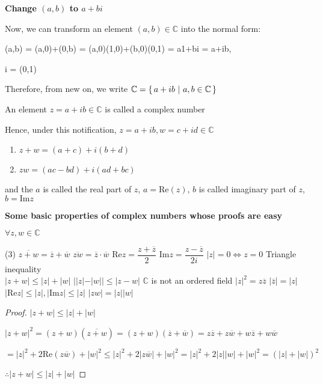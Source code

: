 \textbf{Change $(a,b)$ to $a+bi$}

\begin{tcolorbox}
	Now, we can transform an element $(a,b) \in \mathbb C$ into the normal form:

(a,b) = (a,0)+(0,b) = (a,0)(1,0)+(b,0)(0,1) = a1+bi = a+ib,

 i = (0,1)

Therefore, from new on, we write $\mathbb C = \left\{ \,a+ib~|~a,b \in \mathbb C \,\right\}$

An element $z = a+ib \in \mathbb C$ is called a complex number

Hence, under this notification, $z = a+ib,w = c+id \in \mathbb C$

\begin{enumerate}
	\item $z+w = (a+c) + i(b+d)$
	\item $zw = (ac-bd) + i(ad + bc)$
\end{enumerate}

and the $a$ is called the real part of $z$, $a = \text{Re}(z)$, $b$ is called imaginary part of $z$, $b = \text{Im}z$

\end{tcolorbox}

\newpage

\textbf{Some basic properties of complex numbers whose proofs are easy}

$\forall z,w \in \mathbb C$

\begin{tasks}(3)
	\task[$\cdot$] $\overline{z+w} = \overline{z} + \overline{w}$
	\task[$\cdot$] $\overline{zw} = \overline{z} \cdot \overline{w}$
	\task[$\cdot$] Re$z = \dfrac{z + \overline{z}}{2}$
	\task[$\cdot$] Im$z = \dfrac{z - \overline{z}}{2i}$
	\task[$\cdot$] $|z| = 0 \Leftrightarrow z = 0$
	\task[$\cdot$] Triangle inequality\\$|z+w| \leq |z| + |w|$
	\task[$\cdot$] $||z| - |w|| \leq |z - w|$
	\task[$\cdot$] $\mathbb C$ is not an ordered field
	\task[$\cdot$] $|z|^2 = z\overline{z}$
	\task[$\cdot$] $|\overline{z}| = |z|$
	\task[$\cdot$] $|\text{Re}z| \leq |z|,|\text{Im}z| \leq |z|$
	\task[$\cdot$] $|zw| = |z||w|$  
\end{tasks}

\begin{proof}
	$|z+w| \leq |z|+|w|$
	
	$|z+w|^2 = (z+w)(\overline{z+w}) = (z+w)(\overline{z}+\overline{w}) = z\overline{z}+z\overline{w}+w\overline{z}+w\overline{w}$
	
	$=|z|^2 + 2\text{Re}(z\overline{w})+|w|^2 \leq |z|^2 + 2|z\overline{w}|+|w|^2 = |z|^2 + 2|z||w|+|w|^2 = (|z|+|w|)^2$
	
	$\therefore |z+w| \leq |z| + |w|$
\end{proof}


